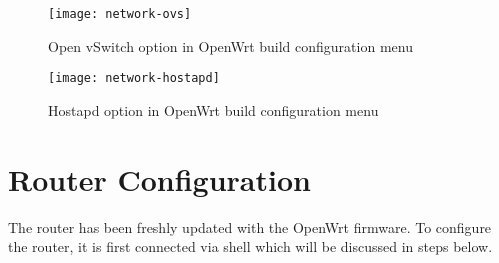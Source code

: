   \begin{figure}[H]
 	\centering
 	\texttt{[image: network-ovs]}
 	\caption {Open vSwitch option in OpenWrt build configuration menu}
 	\label{fig:openvswitch}
 	\vspace{-10pt}
 \end{figure}

 \begin{figure}[H]
	\centering
	\texttt{[image: network-hostapd]}
	\caption {Hostapd option in OpenWrt build configuration menu}
	\label{fig:hostapd}
	\vspace{-10pt}
\end{figure}
\section{Router Configuration}
The router has been freshly updated with the OpenWrt firmware. To configure the router, it is first connected via shell which will be discussed in steps below.
